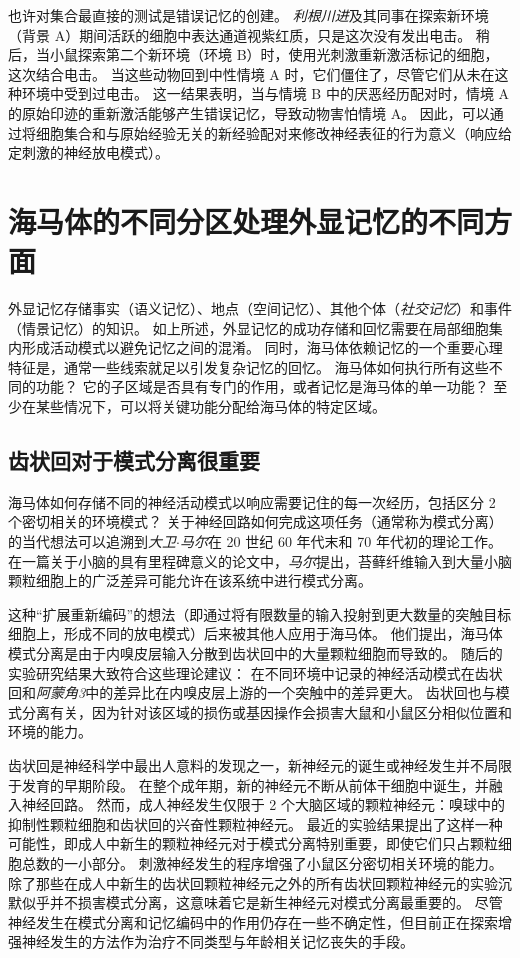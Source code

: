 也许对集合最直接的测试是错误记忆的创建。
\textit{利根川进}及其同事在探索新环境（背景 A）期间活跃的细胞中表达通道视紫红质，只是这次没有发出电击。
稍后，当小鼠探索第二个新环境（环境 B）时，使用光刺激重新激活标记的细胞，这次结合电击。
当这些动物回到中性情境 A 时，它们僵住了，尽管它们从未在这种环境中受到过电击。
这一结果表明，当与情境 B 中的厌恶经历配对时，情境 A 的原始印迹的重新激活能够产生错误记忆，导致动物害怕情境 A。
因此，可以通过将细胞集合和与原始经验无关的新经验配对来修改神经表征的行为意义（响应给定刺激的神经放电模式）。



\section{海马体的不同分区处理外显记忆的不同方面}

外显记忆存储事实（语义记忆）、地点（空间记忆）、其他个体（\textit{社交记忆}）和事件（情景记忆）的知识。
如上所述，外显记忆的成功存储和回忆需要在局部细胞集内形成活动模式以避免记忆之间的混淆。
同时，海马体依赖记忆的一个重要心理特征是，通常一些线索就足以引发复杂记忆的回忆。
海马体如何执行所有这些不同的功能？
它的子区域是否具有专门的作用，或者记忆是海马体的单一功能？
至少在某些情况下，可以将关键功能分配给海马体的特定区域。



\subsection{齿状回对于模式分离很重要}

海马体如何存储不同的神经活动模式以响应需要记住的每一次经历，包括区分 2 个密切相关的环境模式？
关于神经回路如何完成这项任务（通常称为模式分离）的当代想法可以追溯到\textit{大卫$\cdot$马尔}在 20 世纪 60 年代末和 70 年代初的理论工作。
在一篇关于小脑的具有里程碑意义的论文中，\textit{马尔}提出，苔藓纤维输入到大量小脑颗粒细胞上的广泛差异可能允许在该系统中进行模式分离。


这种“扩展重新编码”的想法（即通过将有限数量的输入投射到更大数量的突触目标细胞上，形成不同的放电模式）后来被其他人应用于海马体。
他们提出，海马体模式分离是由于内嗅皮层输入分散到齿状回中的大量颗粒细胞而导致的。
随后的实验研究结果大致符合这些理论建议：
在不同环境中记录的神经活动模式在齿状回和\textit{阿蒙角3}中的差异比在内嗅皮层上游的一个突触中的差异更大。
齿状回也与模式分离有关，因为针对该区域的损伤或基因操作会损害大鼠和小鼠区分相似位置和环境的能力。


齿状回是神经科学中最出人意料的发现之一，新神经元的诞生或神经发生并不局限于发育的早期阶段。
在整个成年期，新的神经元不断从前体干细胞中诞生，并融入神经回路。
然而，成人神经发生仅限于 2 个大脑区域的颗粒神经元：嗅球中的抑制性颗粒细胞和齿状回的兴奋性颗粒神经元。
最近的实验结果提出了这样一种可能性，即成人中新生的颗粒神经元对于模式分离特别重要，即使它们只占颗粒细胞总数的一小部分。
刺激神经发生的程序增强了小鼠区分密切相关环境的能力。
除了那些在成人中新生的齿状回颗粒神经元之外的所有齿状回颗粒神经元的实验沉默似乎并不损害模式分离，这意味着它是新生神经元对模式分离最重要的。
尽管神经发生在模式分离和记忆编码中的作用仍存在一些不确定性，但目前正在探索增强神经发生的方法作为治疗不同类型与年龄相关记忆丧失的手段。




